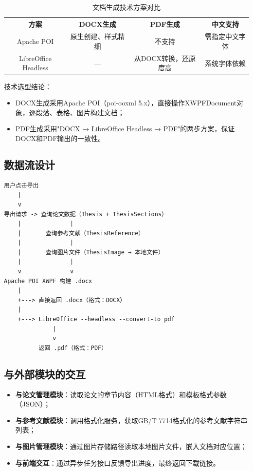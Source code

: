 \documentclass{../softeng}
\begin{document}
\begin{table}[htbp]
\centering
\caption{文档生成技术方案对比}
\label{tab:export_compare}
\begin{tabular}{|c|c|c|c|}
\hline
\textbf{方案} & \textbf{DOCX生成} & \textbf{PDF生成} & \textbf{中文支持} \\
\hline
Apache POI & 原生创建、样式精细 & 不支持 & 需指定中文字体 \\
\hline
LibreOffice Headless & — & 从DOCX转换，还原度高 & 系统字体依赖 \\
\hline
\end{tabular}
\end{table}

技术选型结论：
\begin{itemize}
    \item DOCX生成采用Apache POI（poi-ooxml 5.x），直接操作XWPFDocument对象，逐段落、表格、图片构建文档；
    \item PDF生成采用"DOCX → LibreOffice Headless → PDF"的两步方案，保证DOCX和PDF输出的一致性。
\end{itemize}

\subsection{数据流设计}

\begin{verbatim}
用户点击导出
    |
    v
导出请求 -> 查询论文数据（Thesis + ThesisSections）
    |              |
    |       查询参考文献（ThesisReference）
    |              |
    |       查询图片文件（ThesisImage → 本地文件）
    |              |
    v              v
Apache POI XWPF 构建 .docx
    |
    +---> 直接返回 .docx（格式：DOCX）
    |
    +---> LibreOffice --headless --convert-to pdf
              |
              v
          返回 .pdf（格式：PDF）
\end{verbatim}

\subsection{与外部模块的交互}

\begin{itemize}
    \item \textbf{与论文管理模块}：读取论文的章节内容（HTML格式）和模板格式参数（JSON）；
    \item \textbf{与参考文献模块}：调用格式化服务，获取GB/T 7714格式化的参考文献字符串列表；
    \item \textbf{与图片管理模块}：通过图片存储路径读取本地图片文件，嵌入文档对应位置；
    \item \textbf{与前端交互}：通过异步任务接口反馈导出进度，最终返回下载链接。
\end{itemize}
\end{document}
